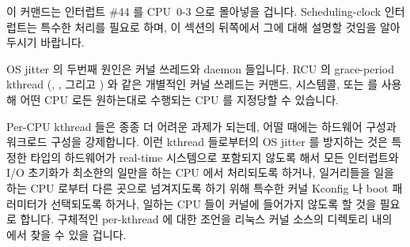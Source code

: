 \begin{quote}
	\scriptsize
\end{quote}

이 커맨드는 인터럽트 \#44 를 CPU~0-3 으로 몰아넣을 겁니다.
Scheduling-clock 인터럽트는 특수한 처리를 필요로 하며, 이 섹션의 뒤쪽에서 그에
대해 설명할 것임을 알아두시기 바랍니다.

OS jitter 의 두번째 원인은 커널 쓰레드와 daemon 들입니다.
RCU 의 grace-period kthread (, , 그리고
) 와 같은 개별적인 커널 쓰레드는  커맨드,
 시스템콜, 또는  를 사용해 어떤 CPU 로든
원하는대로 수행되는 CPU 를 지정당할 수 있습니다.

Per-CPU kthread 들은 종종 더 어려운 과제가 되는데, 어떨 때에는 하드웨어 구성과
워크로드 구성을 강제합니다.
이런 kthread 들로부터의 OS jitter 를 방지하는 것은 특정한 타입의 하드웨어가
real-time 시스템으로 포함되지 않도록 해서 모든 인터럽트와 I/O 초기화가 최소한의
일만을 하는 CPU 에서 처리되도록 하거나, 일거리들을 일을 하는 CPU 로부터 다른
곳으로 넘겨지도록 하기 위해 특수한 커널 Kconfig 나 boot 패러미터가 선택되도록
하거나, 일하는 CPU 들이 커널에 들어가지 않도록 할 것을 필요로 합니다.
구체적인 per-kthread 에 대한 조언을 리눅스 커널 소스의 
디렉토리 내의  에서 찾을 수 있을 겁니다.

